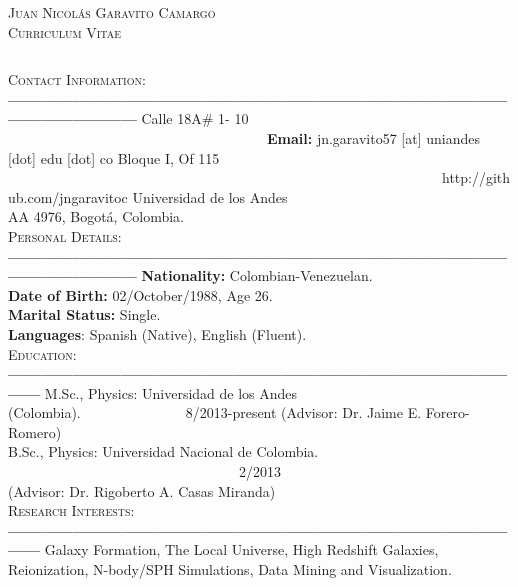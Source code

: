 \documentclass[letterpaper]{article}
\begin{document}
\begin{center}
\textsc{\LARGE Juan Nicol\'as Garavito Camargo}\\
\textsc{\large Curriculum Vitae}\\
\end{center}

$    $


\textsc{\Large Contact Information:}\\
{\bf---------------------------------------------------------------------------------------------------------------------}
Calle 18A\# 1- 10 \indent \ \ \ \ \ \ \ \ \ \ \ \ \ \ \ \ \ \ \ \ \ \ \ \ \ \ \ \ \ \ \ \ \ \  \ \  \ {\bf Email:} jn.garavito57 [at] uniandes [dot] edu [dot] co       
Bloque I, Of 115 \indent \ \ \ \ \ \ \ \ \ \ \ \ \ \ \ \ \ \ \ \ \ \ \ \ \ \ \ \ \ \ \ \ \ \ \ \ \ \ \ \ \ \ \ \ \ \ \ \ \ \ \ \ \ \ \ \ \ \ \ \ \ \    http://github.com/jngaravitoc            
Universidad de los Andes\\
AA 4976, Bogot\'a, Colombia.\\
	
\indent \textsc{\Large Personal Details:}\\
{\bf---------------------------------------------------------------------------------------------------------------------}
{\bf \large Nationality:} \large Colombian-Venezuelan.\\
{\bf Date of Birth:} 02/October/1988, Age 26.\\
{\bf Marital Status:} Single.\\
{\bf Languages}: Spanish (Native), English (Fluent).\\

\textsc{\Large Education:}\\
{\bf---------------------------------------------------------------------------------------------------}
M.Sc., Physics: Universidad de los Andes (Colombia).\indent \ \ \ \ \ \ \ \ \ \ \ \ \ \ \  8/2013-present
(Advisor: Dr. Jaime E. Forero-Romero)\\
B.Sc., Physics: Universidad Nacional de Colombia. \indent \ \ \ \ \ \ \ \ \ \ \ \ \ \ \ \ \ \ \ \ \ \ \ \ \ \ \ \ \ \ \ \ \ 2/2013\\
(Advisor: Dr. Rigoberto A. Casas Miranda)\\

\textsc{\Large Research Interests:}\\
{\bf---------------------------------------------------------------------------------------------------}
Galaxy Formation, The Local Universe, High Redshift Galaxies, Reionization,  N-body/SPH Simulations, Data Mining 
and Visualization.\\
\end{document}
